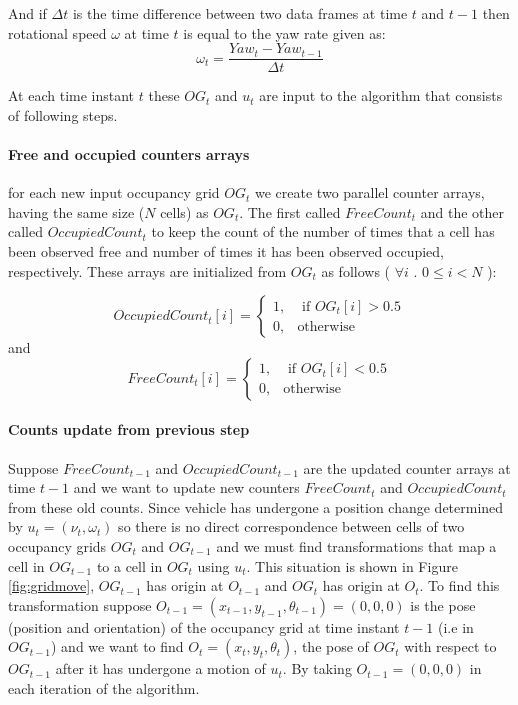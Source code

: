 And if $\Delta t$ is the time difference between two data frames at time $t$ and $t-1$ then rotational speed $\omega$
at time $t$ is equal to the yaw rate given as:
\begin{equation}
\omega_t = \frac{Yaw_t-Yaw_{t-1}}{\Delta t}
\end{equation}

At each time instant $t$ these $OG_t$ and $u_t$ are input to the algorithm that consists of 
following steps.

\paragraph{Free and occupied counters arrays} for each new input occupancy grid $OG_t$ we 
create two parallel counter arrays, having the same size ($N$ cells) as $OG_t$. The first called $FreeCount_t$ and the other called $OccupiedCount_t$ to keep the count of the number of times that a cell has been observed free and number of times it has been observed occupied, respectively. These arrays are initialized from $OG_t$ as follows ( $\forall i$  . $0 \leq i<N$ ):

\begin{equation}
OccupiedCount_t[i] =  \begin{cases} 1, & \mbox{ if $OG_t[i] > 0.5$} \\
                       0, & \mbox{otherwise} \end{cases}
\end{equation}
and
\begin{equation}
FreeCount_t[i] = \begin{cases} 1, & \mbox{ if $OG_t[i] < 0.5$} \\
                       0, & \mbox{otherwise} \end{cases}
\end{equation}

\paragraph{Counts update from previous step} Suppose $FreeCount_{t-1}$ and  $OccupiedCount_{t-1}$ are the
updated counter arrays at time $t-1$ and we want to update new counters $FreeCount_t$ and $OccupiedCount_t$
from these old counts. Since vehicle has undergone a position change determined by $u_t=(\nu_t, \omega_t)$
so there is no direct correspondence between cells of two occupancy grids $OG_t$ and $OG_{t-1}$ and we
must find transformations that map a cell in  $OG_{t-1}$ to a cell in $OG_{t}$ using $u_t$. This situation is
shown in Figure \ref{fig:gridmove}, $OG_{t-1}$ has origin at $O_{t-1}$ and $OG_t$ has origin at $O_t$. To find this transformation suppose $O_{t-1}=(x_{t-1}, y_{t-1}, \theta_{t-1}) = (0,0,0)$ is the pose (position and orientation) of the occupancy grid at time instant $t-1$ (i.e in $OG_{t-1}$) and we want to find $O_t=(x_t, y_t, \theta_t)$, the pose of $OG_t$ with respect to $OG_{t-1}$ after it has undergone a motion of $u_t$. By taking $O_{t-1}=(0,0,0)$ in each iteration of the algorithm.


